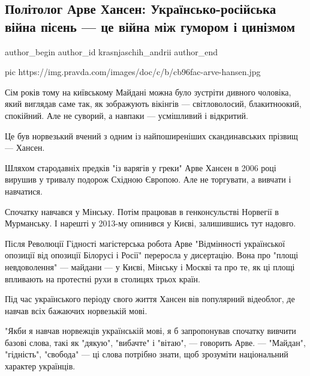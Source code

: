  
 
 
 
 
 
\subsection{Політолог Арве Хансен: Українсько-російська війна пісень — це війна між гумором і цинізмом}
\label{sec:21_12_2020.news.ua.pravda.krasnjaschih_andrii.1.vijna_pisen}
\ifcmt
	author_begin
   author_id krasnjaschih_andrii
	author_end
\fi

\ifcmt
pic https://img.pravda.com/images/doc/c/b/cb96fac-arve-hansen.jpg
\fi


Сім років тому на київському Майдані можна було зустріти дивного чоловіка, який
виглядав саме так, як зображують вікінгів — світловолосий, блакитноокий,
спокійний. Але не суворий, а навпаки — усмішливий і відкритий.

Це був норвезький вчений з одним із найпоширеніших скандинавських прізвищ —
Хансен.

Шляхом стародавніх предків "із варягів у греки" Арве Хансен в 2006 році вирушив
у тривалу подорож Східною Європою. Але не торгувати, а вивчати і навчатися.

Спочатку навчався у Мінську. Потім працював в генконсульстві Норвегії в
Мурманську. І нарешті у 2013-му опинився у Києві, залишившись тут надовго.

Після Революції Гідності магістерська робота Арве "Відмінності української
опозиції від опозиції Білорусі і Росії" переросла у дисертацію. Вона про "площі
невдоволення" — майдани — у Києві, Мінську і Москві та про те, як ці площі
впливають на протестні рухи в столицях трьох країн.

Під час українського періоду свого життя Хансен вів популярний відеоблог, де
навчав всіх бажаючих норвезькій мові.

"Якби я навчав норвежців українській мові, я б запропонував спочатку вивчити
базові слова, такі як "дякую", "вибачте" і "вітаю", — говорить Арве. —
"Майдан", "гідність", "свобода" — ці слова потрібно знати, щоб зрозуміти
національний характер українців. 

